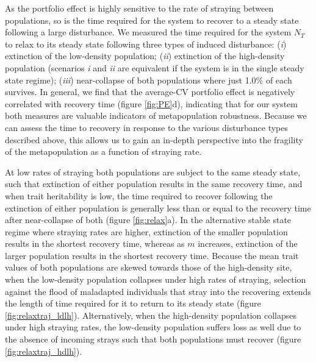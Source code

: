 \documentclass[twocolumn,preprintnumbers,amsmath,amssymb,superscriptaddress]{revtex4}
\begin{document}
As the portfolio effect is highly sensitive to the rate of straying between populations, so is the time required for the system to recover to a steady state following a large disturbance.
We measured the time required for the system $N_T$ to relax to its steady state following three types of induced disturbance: (\emph{i}) extinction of the low-density population; (\emph{ii}) extinction of the high-density population (scenarios \emph{i} and \emph{ii} are equivalent if the system is in the single steady state regime); (\emph{iii}) near-collapse of both populations where just 1.0\% of each survives.
In general, we find that the average-CV portfolio effect is negatively correlated with recovery time (figure \ref{fig:PE}d), indicating that for our system both measures are valuable indicators of metapopulation robustness.
Because we can assess the time to recovery in response to the various disturbance types described above, this allows us to gain an in-depth perspective into the fragility of the metapopulation as a function of straying rate.

At low rates of straying both populations are subject to the same steady state, such that extinction of either population results in the same recovery time, and when trait heritability is low, the time required to recover following the extinction of either population is generally less than or equal to the recovery time after near-collapse of both (figure \ref{fig:relax}a).
In the alternative stable state regime where straying rates are higher, extinction of the smaller population results in the shortest recovery time, whereas as $m$ increases, extinction of the larger population results in the shortest recovery time.
Because the mean trait values of both populations are skewed towards those of the high-density site, when the low-density population collapses under high rates of straying, selection against the flood of maladapted individuals that stray into the recovering extends the length of time required for it to return to its steady state (figure \ref{fig:relaxtraj_ldlh}).
Alternatively, when the high-density population collapses under high straying rates, the low-density population suffers loss as well due to the absence of incoming strays such that both populations must recover (figure \ref{fig:relaxtraj_hdlh}).
\end{document}
